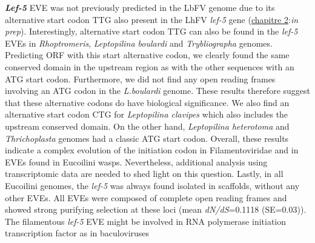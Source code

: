 \textit{\textbf{Lef-5}} EVE was not previously predicted in the LbFV genome due to its alternative start codon TTG also present in the LhFV \textit{lef-5} gene (\hyperref[sec:chap2]{chapitre 2}:\textit{in prep}). Interestingly, alternative start codon TTG can also be found in the \textit{lef-5} EVEs in \textit{Rhoptromeris}, \textit{Leptopilina boulardi} and \textit{Trybliographa} genomes. Predicting ORF with this start alternative codon, we clearly found the same conserved domain in the upstream region as with the other sequences with an ATG start codon. Furthermore, we did not find any open reading frames involving an ATG codon in the \textit{L.boulardi} genome. These results therefore suggest that these alternative codons do have biological significance. We also find an alternative start codon CTG for \textit{Leptopilina clavipes} which also includes the upstream conserved domain. On the other hand, \textit{Leptopilina heterotoma} and \textit{Thrichoplasta} genomes had a classic ATG start codon. Overall, these results indicate a complex evolution of the initiation codon in Filamentoviridae and in EVEs found in Eucoilini wasps. Nevertheless, additional analysis using transcriptomic data are needed to shed light on this question. Lastly, in all Eucoilini genomes, the \textit{lef-5} was always found isolated in scaffolds, without any other EVEs. All EVEs were composed of complete open reading frames and showed strong purifying selection at these loci (mean \textit{dN/dS}=0.1118 (SE=0.03)). The filamentous \textit{lef-5} EVE might be involved in RNA polymerase initiation  transcription factor as in baculoviruses \citep{su_autographa_2011}\\ 

